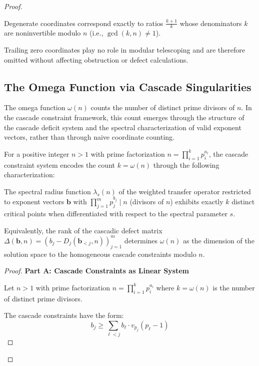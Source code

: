 \begin{proof}
\begin{observation}
\label{obs:degeneracy-invertibility}
Degenerate coordinates correspond exactly to ratios $\frac{k+1}{k}$ whose denominators $k$ are noninvertible modulo $n$ (i.e., $\gcd(k,n) \neq 1$).

Trailing zero coordinates play no role in modular telescoping and are therefore omitted without affecting obstruction or defect calculations.
\end{observation}

\subsection{The Omega Function via Cascade Singularities}
\label{subsec:omega-epimoric}

The omega function $\omega(n)$ counts the number of distinct prime divisors of $n$. In the cascade constraint framework, this count emerges through the structure of the cascade deficit system and the spectral characterization of valid exponent vectors, rather than through naive coordinate counting.

\begin{theorem}
\label{thm:omega-characterization}
For a positive integer $n > 1$ with prime factorization $n = \prod_{i=1}^k p_i^{a_i}$, the cascade constraint system encodes the count $k = \omega(n)$ through the following characterization:

The spectral radius function $\lambda_s(n)$ of the weighted transfer operator restricted to exponent vectors $\mathbf{b}$ with $\prod_{j=1}^m p_j^{b_j} \mid n$ (divisors of $n$) exhibits exactly $k$ distinct critical points when differentiated with respect to the spectral parameter $s$.

Equivalently, the rank of the cascadic defect matrix $\Delta(\mathbf{b}, n) = (b_j - D_j(\mathbf{b}_{<j}, n))_{j=1}^m$ determines $\omega(n)$ as the dimension of the solution space to the homogeneous cascade constraints modulo $n$.
\end{theorem}

\begin{proof}

\noindent \textbf{Part A: Cascade Constraints as Linear System}

Let $n > 1$ with prime factorization $n = \prod_{i=1}^k p_i^{a_i}$ where $k = \omega(n)$ is the number of distinct prime divisors.

The cascade constraints have the form:
\begin{equation}
b_j \geq \sum_{\ell < j} b_\ell \cdot v_{p_j}(p_\ell - 1)
\end{equation}


\end{proof}
\end{proof}
